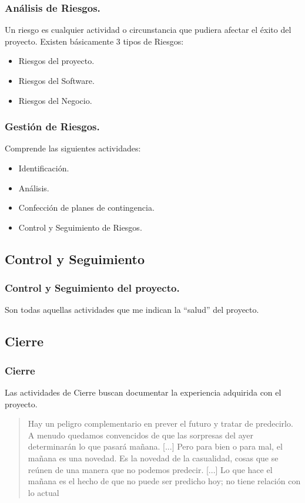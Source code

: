 \documentclass[12pt]{beamer}
\begin{document}
\begin{frame}
 \frametitle{Análisis de Riesgos.}
 Un riesgo es cualquier actividad o circunstancia que pudiera afectar el éxito del proyecto.
 \newline
 Existen básicamente 3 tipos de Riesgos:
 
 \begin{itemize}
  \item<2-> Riesgos del proyecto.
  \item<3-> Riesgos del Software.
  \item<4-> Riesgos del Negocio.
 \end{itemize}
 
\end{frame}


\begin{frame}
 \frametitle{Gestión de Riesgos.}
 Comprende las siguientes actividades:
 
 \begin{itemize}
  \item<2-> Identificación.
  \item<3-> Análisis.
  \item<4-> Confección de planes de contingencia.
  \item<5-> Control y Seguimiento de Riesgos.
 \end{itemize}
 
\end{frame}


\subsection{Control y Seguimiento}

\begin{frame}
 \frametitle{Control y Seguimiento del proyecto.}
 Son todas aquellas actividades que me indican la ``salud'' del proyecto.
\end{frame}


\subsection{Cierre}

\begin{frame}
 \frametitle{Cierre}
 Las actividades de Cierre buscan documentar la experiencia adquirida con el proyecto.
\end{frame}


\begin{frame}
 \begin{quote}
Hay un peligro complementario en prever el futuro y tratar de predecirlo. A menudo quedamos convencidos de que las sorpresas del ayer determinarán lo que pasará mañana. [...] Pero para bien o para mal, el mañana es una novedad. Es la novedad de la casualidad, cosas que se reúnen de una manera que no podemos predecir. [...] Lo que hace el mañana es el hecho de que no puede ser predicho hoy; no tiene relación con lo actual
 \newline
 \end{quote}
\end{frame}
\end{document}

